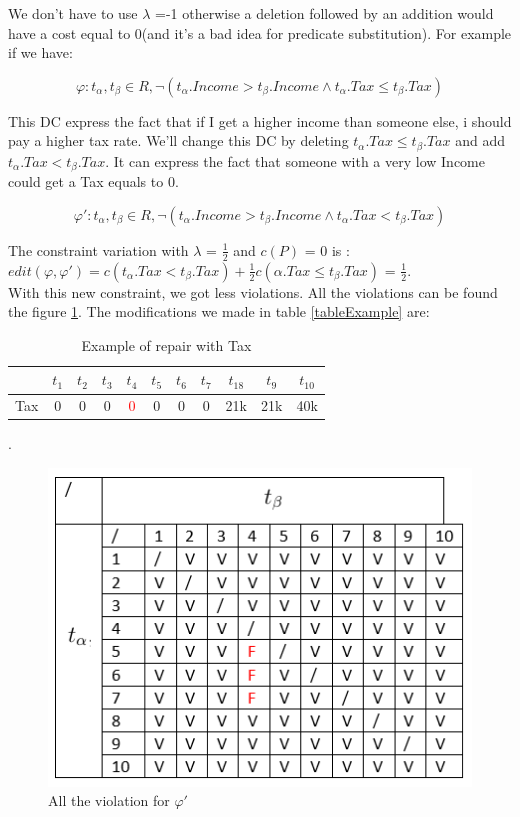 \documentclass[letterpaper, 12pt]{report}
\theoremstyle{definition}
\begin{document}
We don't have to use $\lambda$ =-1 otherwise a deletion followed by an addition would have a cost equal to 0(and it's a bad idea for predicate substitution). For example if we have:

$$ \varphi : t_\alpha,t_\beta \in R, \neg(t_\alpha.Income > t_\beta.Income \wedge t_\alpha.Tax \leq t_\beta.Tax)$$

This DC express the fact that if I get a higher income than someone else, i should pay a higher tax rate. We'll change this DC by deleting $t_\alpha.Tax \leq t_\beta.Tax$ and add $t_\alpha.Tax < t_\beta.Tax$. It can express the fact that someone with a very low Income could get a Tax equals to 0.

$$ \varphi ' : t_\alpha,t_\beta \in R, \neg(t_\alpha.Income > t_\beta.Income \wedge t_\alpha.Tax < t_\beta.Tax)$$

The constraint variation with $\lambda$ = $\frac{1}{2}$ and $c(P)$ = 0 is : $edit(\varphi, \varphi') = c(t_\alpha.Tax < t_\beta.Tax) + \frac{1}{2} c(\alpha.Tax \leq t_\beta.Tax)$ = $\frac{1}{2}$. \\

With this new constraint, we got less violations. All the violations can be found the figure \ref{GoodTax}. The modifications we made in table \ref{tableExample} are:

\begin{table}[H]
	\centering
	\begin{tabular}{|c|c c c c c c c c c c|}
	\hline
	   & $t_1$ & $t_2$ & $t_3$ &$t_4$ &$t_5$ &$t_6$ &$t_7$ &$t_18$ &$t_9$ &$t_10$ \\
	\hline
	 Tax & 0 & 0 & 0 & \textcolor{red}{0} & 0 & 0 & 0 & 21k & 21k & 40k\\
	 \hline
	\end{tabular}
	\caption{\label{tableExample2} Example of repair with Tax}.
\end{table}


\begin{figure}
	\centering
	\includegraphics[scale=1]{img/TaxGood}
	\caption{\label{GoodTax} All the violation for $\varphi '$}
\end{figure}
\end{document}
